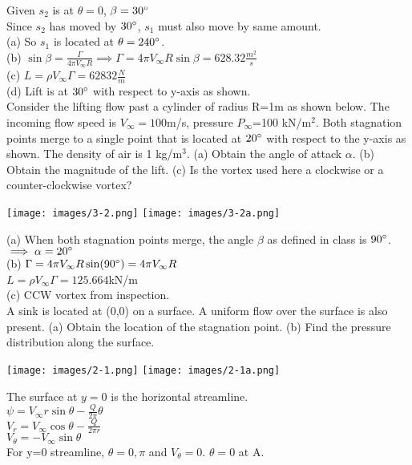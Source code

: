 \documentclass[12pt, twocolumn, letterpaper]{article}
\begin{document}
Given $s_2$ is at $\theta=0$, $\beta=30\degree$\\
Since $s_2$ has moved by $30\degree$, $s_1$ must also move by same amount.\\
(a) So $s_1$ is located at $\theta=240\degree$.\\
(b) $\sin\beta=\frac{\Gamma}{4\pi V_\infty R}\implies\Gamma=4\pi V_\infty R\sin\beta=628.32\frac{m^2}{s}$\\
(c) $L=\rho V_\infty \Gamma=62832 \frac{N}{m}$\\
(d) Lift is at $30\degree$ with respect to y-axis as shown.\\
\hline
Consider the lifting flow past a cylinder of radius R=1m as shown below. The incoming flow speed is $V_\infty=100$m/s, pressure $P_\infty$=100 kN/m$^2$. Both stagnation points merge to a single point that is located at $20\degree$ with respect to the y-axis as shown. The density of air is 1 kg/m$^3$. (a) Obtain the angle of attack $\alpha$. (b) Obtain the magnitude of the lift. (c) Is the vortex used here a clockwise or a counter-clockwise vortex?\\
\begin{center}
    \texttt{[image: images/3-2.png]}
    \texttt{[image: images/3-2a.png]}
\end{center}
(a) When both stagnation points merge, the angle $\beta$ as defined in class is $90\degree$. $\implies \alpha=20\degree$\\
(b) $\Gamma=4\pi V_\infty R\sin(90\degree)=4\pi V_\infty R$\\
$L=\rho V_\infty \Gamma=125.664$kN/m\\
(c) CCW vortex from inspection.\\
\hline
A sink is located at (0,0) on a surface. A uniform flow over the surface is also present. (a) Obtain the location of the stagnation point. (b) Find the pressure distribution along the surface.
\begin{center}
    \texttt{[image: images/2-1.png]}
    \texttt{[image: images/2-1a.png]}
\end{center}
The surface at $y=0$ is the horizontal streamline.\\
$\psi=V_\infty r\sin\theta-\frac{Q}{2\pi}\theta$\\
$V_r=V_\infty\cos\theta-\frac{Q}{2\pi r}$\\
$V_\theta=-V_\infty\sin\theta$\\
For y=0 streamline, $\theta=0, \pi$ and $V_\theta=0$. $\theta=0$ at A.\\
\end{document}
